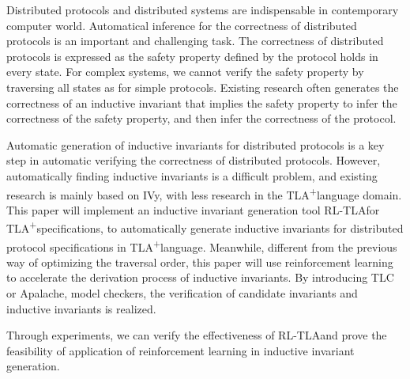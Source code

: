 \documentclass[
    type = bachelor,
    degree = academic,
    twoside,
    fontset = win,
    decl-page
]
{njuthesis}
\newcommand{\TLA}{TLA\textsuperscript{+}}
\newcommand{\rltla}{RL-TLA}
\begin{document}
\begin{abstract*}
    Distributed protocols and distributed systems are indispensable in contemporary computer world. Automatical inference for the correctness of distributed protocols is an important and challenging task.
    The correctness of distributed protocols is expressed as the safety property defined by the protocol holds in every state.
    For complex systems, we cannot verify the safety property by traversing all states as for simple protocols.
    Existing research often generates the correctness of an inductive invariant that implies the safety property to infer the correctness of the safety property, and then infer the correctness of the protocol.
    
    Automatic generation of inductive invariants for distributed protocols is a key step in automatic verifying the correctness of distributed protocols.
    However, automatically finding inductive invariants is a difficult problem, and existing research is mainly based on IVy, with less research in the \TLA language domain.
    This paper will implement an inductive invariant generation tool \rltla for \TLA specifications, to automatically generate inductive invariants for distributed protocol specifications in \TLA language.
    Meanwhile, different from the previous way of optimizing the traversal order, this paper will use reinforcement learning to accelerate the derivation process of inductive invariants.
    By introducing TLC or Apalache, model checkers, the verification of candidate invariants and inductive invariants is realized.

    Through experiments, we can verify the effectiveness of \rltla and prove the feasibility of application of reinforcement learning in inductive invariant generation.

\end{abstract*}

\tableofcontents

\mainmatter












\printbibliography
\end{document}

